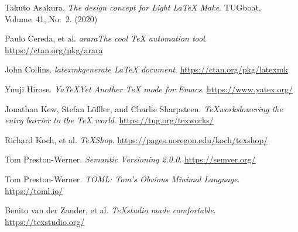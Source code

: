 \documentclass[draft]{llmk-doc}
\begin{document}
\begin{thebibliography}{9}
  Takuto Asakura. \textit{The design concept for \Dash Light {\LaTeX}
  Make}. TUGboat, Volume~41, No.~2. (2020)

  Paulo Cereda, et al. \textit{arara\Dash The cool {\TeX} automation
  tool}. \url{https://ctan.org/pkg/arara}

  John Collins. \textit{latexmk\Dash generate {\LaTeX} document}.
  \url{https://ctan.org/pkg/latexmk}

  Yuuji Hirose. \textit{YaTeX\Dash Yet Another TeX mode for Emacs}.
  \url{https://www.yatex.org/}

  Jonathan Kew, Stefan L\"offler, and Charlie Sharpsteen.
  \textit{{\TeX}works\Dash lowering the entry barrier to the {\TeX} world}.
  \url{https://tug.org/texworks/}

  Richard Koch, et al. \textit{{\TeX}Shop}.
  \url{https://pages.uoregon.edu/koch/texshop/}

  Tom Preston-Werner. \textit{Semantic Versioning 2.0.0}.
  \url{https://semver.org/}

  Tom Preston-Werner. \textit{TOML: Tom's Obvious Minimal Language}.
  \url{https://toml.io/}

  Benito van der Zander, et al.
  \textit{{\TeX}studio\Dash {\LaTeX} made comfortable}.\\
  \url{https://texstudio.org/}
\end{thebibliography}
\end{document}
